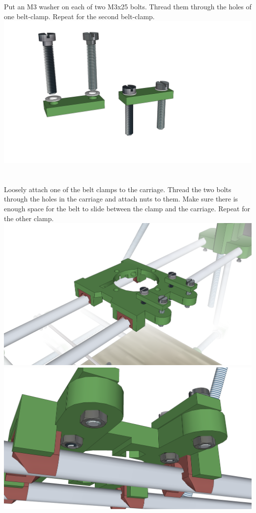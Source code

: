 \documentclass[twoside,a4paper,titlepage]{memoir}
\begin{document}
	\section{}
	Put an M3 washer on each of two M3x25 bolts. Thread them through the holes of one belt-clamp.
	Repeat for the second belt-clamp.\\
	\includegraphics[width=1\linewidth]{graphics/ch9_12.png}
	
	\section{}
	Loosely attach one of the belt clamps to the carriage. Thread the two bolts through the holes in the
	carriage and attach nuts to them. Make sure there is enough space for the belt to slide between the
	clamp and the carriage. Repeat for the other clamp.\\
	\includegraphics[width=1\linewidth]{graphics/ch9_13_1.png}
	\includegraphics[width=1\linewidth]{graphics/ch9_13_2.png}
	
\end{document}

